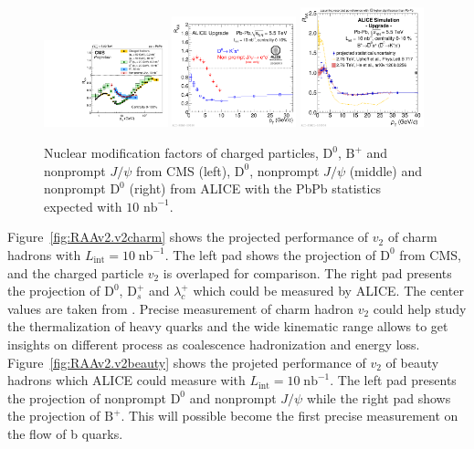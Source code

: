 \begin{figure}[ht]
  \begin{center}
    \includegraphics[width=0.32\textwidth]{hf/figures/cRAA_lumiTG_10_lumiMB_0_v2_right.pdf}
    \includegraphics[width=0.32\textwidth]{hf/figures/2013-Oct-24-D0BJpsiRAAprompt_TDR_logo.pdf}
    \includegraphics[width=0.32\textwidth]{hf/figures/2016-Jun-10-BMeson_wPID_Raa.pdf}
    \caption{Nuclear modification factors of charged particles, $\mathrm{D}^{0}$, $\mathrm{B}^{+}$ and nonprompt $J/\psi$ from CMS (left), $\mathrm{D}^{0}$, nonprompt $J/\psi$ (middle) and nonprompt $\mathrm{D}^{0}$ (right) from ALICE with the PbPb statistics expected with $10$ $\mathrm{nb}^{-1}$.}
    \label{fig:RAAv2.RAA}
  \end{center}
\end{figure}


Figure~\ref{fig:RAAv2.v2charm} shows the projected performance of $v_{2}$ of charm hadrons with $L_{\mathrm{int}}=10\;\mathrm{nb}^{-1}$. The left pad shows the projection of $\mathrm{D}^{0}$ from CMS, and the charged particle $v_{2}$ is overlaped for comparison. The right pad presents the projection of $\mathrm{D}^{0}$, $\mathrm{D}_{s}^{+}$ and $\lambda_{c}^{+}$ which could be measured by ALICE. The center values are taken from \cite{v2charmtheory}. Precise measurement of charm hadron $v_{2}$ could help study the thermalization of heavy quarks and the wide kinematic range allows to get insights on different process as coalescence hadronization and energy loss. Figure~\ref{fig:RAAv2.v2beauty} shows the projeted performance of $v_{2}$ of beauty hadrons which ALICE could measure with $L_{\mathrm{int}}=10\;\mathrm{nb}^{-1}$. The left pad presents the projection of nonprompt $\mathrm{D}^{0}$ and nonprompt $J/\psi$ while the right pad shows the projection of $\mathrm{B}^{+}$. This will possible become the first precise measurement on the flow of b quarks.

